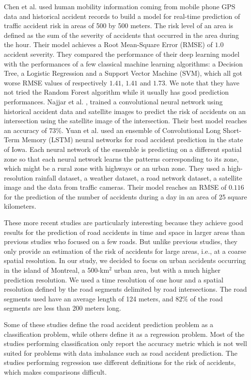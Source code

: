 \documentclass[conference]{IEEEtran}
\begin{document}
Chen et al. \cite{QChen2016} used human mobility information coming from
mobile phone GPS data and historical accident records to build a model for
real-time prediction of traffic accident risk in areas of 500 by 500
meters. The risk level of an area is defined as the sum of the severity of
accidents that occurred in the area during the hour. Their model achieves
a Root Mean-Square Error (RMSE) of $1.0$ accident severity. They compared the performance of their deep learning
model with the performances of a few classical machine learning
algorithms: a Decision Tree, a Logistic Regression and a Support Vector
Machine (SVM), which all got worse RMSE values of respectively $1.41$,
$1.41$ and $1.73$. We note that they have not tried the Random
Forest algorithm while it usually has good prediction performances. Najjar et
al. \cite{Najjar2017}, trained a convolutional neural network using
historical accident data and satellite images to predict the risk of
accidents on an intersection using the satellite image of the intersection.
Their best model reaches an accuracy of $73\%$. Yuan et al. \cite{Yuan2018}
used an ensemble of Convolutional Long Short-Term Memory (LSTM) neural
networks for road accident prediction in the state of Iowa. Each neural
network of the ensemble is predicting on a different spatial zone so that
each neural network learns the patterns corresponding to its zone, which
might be a rural zone with highways or an urban zone. They used a
high-resolution rainfall dataset, a weather dataset, a road network
dataset, a satellite image and the data from traffic cameras. Their model
reaches an RMSE of $0.116$ for the prediction of the number of accidents during
a day in an area of 25 square kilometers.

These more recent studies are particularly interesting because they achieve
good results for the prediction of road accidents in time and space in
larger areas than previous studies who focused on a few roads. But unlike
previous studies, they only provide an estimation of the risk of accidents
for large areas, i.e., at a coarse spatial resolution.
In our study, we decided to focus on urban accidents
occurring in the island of Montreal, a 500-km$^2$ urban area, but with a much higher
prediction resolution. We used a time resolution of one hour and a spatial
resolution defined by the road segments delimited by road intersections. The road
segments used have an average length of 124 meters, and $82\%$ of the road
segments are less than 200 meters long.

Some of these studies define the road accident prediction problem as a 
classification problem, while others define it as a regression problem.
Most of the studies performing classification only report the accuracy
metric which is not well suited for problems with data imbalance such as
road accident prediction\cite{He2009}. The studies performing regression
use different definitions for the risk of accidents, which makes comparisons
difficult.
\end{document}
